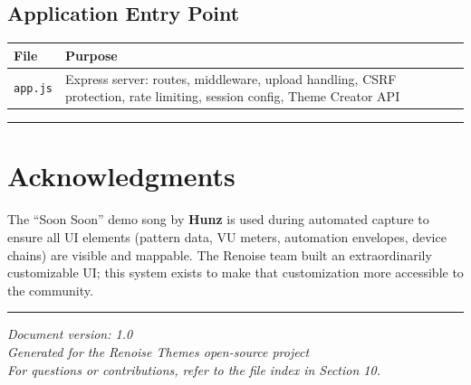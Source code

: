 \documentclass[
  11pt,
  oneside]{report}
\begin{document}
\subsection{Application Entry Point}\label{application-entry-point}

\begin{longtable}[]{@{}
  >{\raggedright\arraybackslash}p{}
  >{\raggedright\arraybackslash}p{}@{}}
\toprule\noalign{}
\begin{minipage}[b]{\linewidth}\raggedright
File
\end{minipage} & \begin{minipage}[b]{\linewidth}\raggedright
Purpose
\end{minipage} \\
\midrule\noalign{}
\endhead
\bottomrule\noalign{}
\endlastfoot
\texttt{app.js} & Express server: routes, middleware, upload handling,
CSRF protection, rate limiting, session config, Theme Creator API \\
\end{longtable}

\begin{center}\rule{0.5\linewidth}{0.5pt}\end{center}

\section{Acknowledgments}\label{acknowledgments}

The ``Soon Soon'' demo song by \textbf{Hunz} is used during automated
capture to ensure all UI elements (pattern data, VU meters, automation
envelopes, device chains) are visible and mappable. The Renoise team
built an extraordinarily customizable UI; this system exists to make
that customization more accessible to the community.

\begin{center}\rule{0.5\linewidth}{0.5pt}\end{center}

\emph{Document version: 1.0}\\
\emph{Generated for the Renoise Themes open-source project}\\
\emph{For questions or contributions, refer to the file index in Section
10.}
\end{document}
